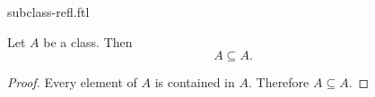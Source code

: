\documentclass{stex}
\begin{document}
\begin{smodule}{subclass-refl.ftl}

  \begin{forthel}
  \end{forthel}

  \begin{forthel}
    \begin{proposition}
      Let $A$ be a class.
      Then \[ A \subseteq A. \]
    \end{proposition}
    \begin{proof}
      Every element of $A$ is contained in $A$.
      Therefore $A \subseteq A$.
    \end{proof}
  \end{forthel}
\end{smodule}
\end{document}

